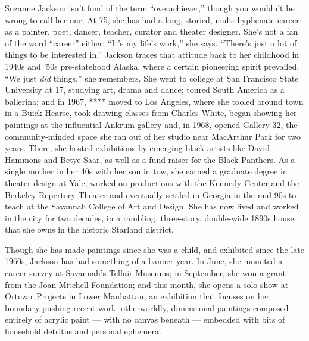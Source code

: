 \href{http://www.suzannefjackson.net/}{Suzanne Jackson} isn't fond of
the term ``overachiever,'' though you wouldn't be wrong to call her one.
At 75, she has had a long, storied, multi-hyphenate career as a painter,
poet, dancer, teacher, curator and theater designer. She's not a fan of
the word ``career'' either: ``It's my life's work,'' she says. ``There's
just a lot of things to be interested in.'' Jackson traces that attitude
back to her childhood in 1940s and '50s pre-statehood Alaska, where a
certain pioneering spirit prevailed. ``We just \emph{did} things,'' she
remembers. She went to college at San Francisco State University at 17,
studying art, drama and dance; toured South America as a ballerina; and
in 1967, **** moved to Los Angeles, where she tooled around town in a
Buick Hearse, took drawing classes from
\href{https://www.nytimes.com/2018/09/28/t-magazine/art/charles-white-moma-retrospective.html}{Charles
White}, began showing her paintings at the influential Ankrum gallery
and, in 1968, opened Gallery 32, the community-minded space she ran out
of her studio near MacArthur Park for two years. There, she hosted
exhibitions by emerging black artists like
\href{https://www.nytimes.com/2018/02/09/t-magazine/art/steve-cannon-david-hammons.html}{David
Hammons} and
\href{https://www.nytimes.com/2019/09/04/arts/design/betye-saar.html}{Betye
Saar}, as well as a fund-raiser for the Black Panthers. As a single
mother in her 40s with her son in tow, she earned a graduate degree in
theater design at Yale, worked on productions with the Kennedy Center
and the Berkeley Repertory Theater and eventually settled in Georgia in
the mid-90s to teach at the Savannah College of Art and Design. She has
now lived and worked in the city for two decades, in a rambling,
three-story, double-wide 1890s house that she owns in the historic
Starland district.

Though she has made paintings since she was a child, and exhibited since
the late 1960s, Jackson has had something of a banner year. In June, she
mounted a career survey at Savannah's
\href{https://www.telfair.org/}{Telfair Museums}; in September, she
\href{https://joanmitchellfoundation.org/artist-programs/artist-grants/painter-sculptors/2019/suzanne-jackson}{won
a grant} from the Joan Mitchell Foundation; and this month, she opens a
\href{http://www.ortuzarprojects.com/exhibitions/suzanne-jackson/works?view=slider}{solo
show} at Ortuzar Projects in Lower Manhattan, an exhibition that focuses
on her boundary-pushing recent work: otherworldly, dimensional paintings
composed entirely of acrylic paint --- with no canvas beneath ---
embedded with bits of household detritus and personal ephemera.


